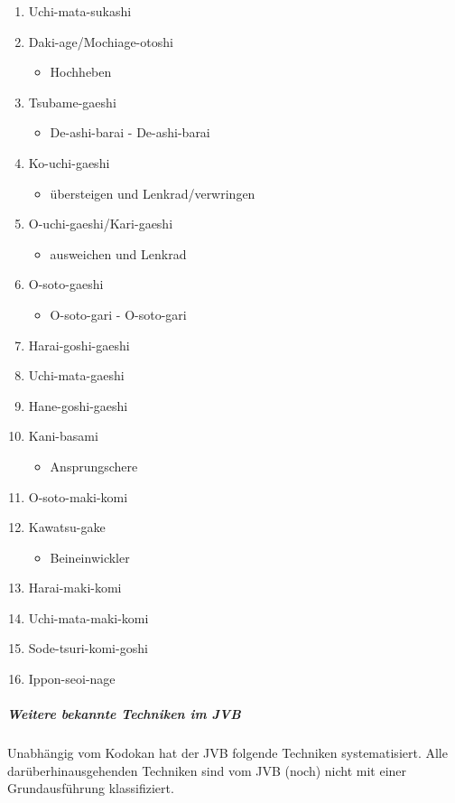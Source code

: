 \documentclass[justified, a4paper, notitlepage, captions=tableheading, nobib]{tufte-handout}
\begin{document}
\begin{itemize}
\begin{enumerate}
\item Uchi-mata-sukashi
\item Daki-age/Mochiage-otoshi
\begin{itemize}
\item Hochheben
\end{itemize}
\item Tsubame-gaeshi
\begin{itemize}
\item De-ashi-barai - De-ashi-barai
\end{itemize}
\item Ko-uchi-gaeshi
\begin{itemize}
\item übersteigen und Lenkrad/verwringen
\end{itemize}
\item O-uchi-gaeshi/Kari-gaeshi
\begin{itemize}
\item ausweichen und Lenkrad
\end{itemize}
\item O-soto-gaeshi
\begin{itemize}
\item O-soto-gari - O-soto-gari
\end{itemize}
\item Harai-goshi-gaeshi
\item Uchi-mata-gaeshi
\item Hane-goshi-gaeshi
\item Kani-basami
\begin{itemize}
\item Ansprungschere
\end{itemize}
\item O-soto-maki-komi
\item Kawatsu-gake
\begin{itemize}
\item Beineinwickler
\end{itemize}
\item Harai-maki-komi
\item Uchi-mata-maki-komi
\item Sode-tsuri-komi-goshi
\item Ippon-seoi-nage
\end{enumerate}
\end{itemize}

\subparagraph{Weitere bekannte Techniken im JVB}
\label{sec:org47f064f}
Unabhängig vom Kodokan hat der JVB folgende Techniken systematisiert. Alle darüberhinausgehenden Techniken sind vom JVB (noch) nicht mit einer Grundausführung klassifiziert.
\end{document}
